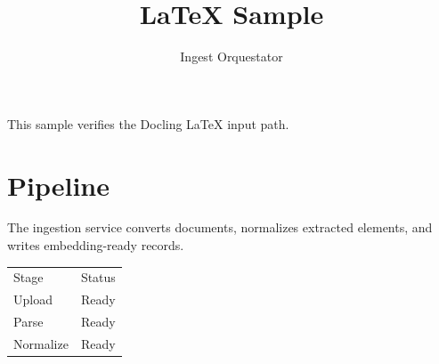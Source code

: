 \documentclass{article}
\title{LaTeX Sample}
\author{Ingest Orquestator}
\begin{document}
\maketitle

This sample verifies the Docling LaTeX input path.

\section{Pipeline}
The ingestion service converts documents, normalizes extracted elements, and
writes embedding-ready records.

\begin{tabular}{ll}
Stage & Status \\
Upload & Ready \\
Parse & Ready \\
Normalize & Ready \\
\end{tabular}
\end{document}
